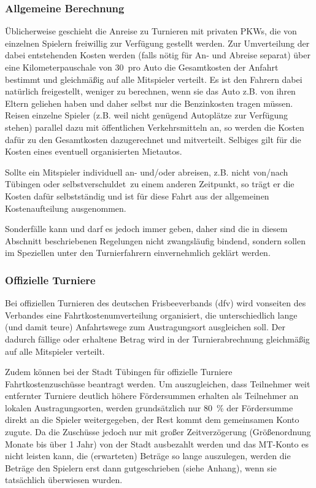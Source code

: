 \documentclass[a4 paper, 11pt]{article}
\begin{document}
\subsubsection{Allgemeine Berechnung}
Üblicherweise geschieht die Anreise zu Turnieren mit privaten PKWs, die von einzelnen Spielern freiwillig zur Verfügung gestellt werden. Zur Umverteilung der dabei entstehenden Kosten werden (falls nötig für An- und Abreise separat) über eine Kilometerpauschale von 30\, pro Auto die Gesamtkosten der Anfahrt bestimmt und gleichmäßig auf alle Mitspieler verteilt. Es ist den Fahrern dabei natürlich freigestellt, weniger zu berechnen, wenn sie das Auto z.B. von ihren Eltern geliehen haben und daher selbst nur die Benzinkosten tragen müssen. Reisen einzelne Spieler (z.B. weil nicht genügend Autoplätze zur Verfügung stehen) parallel dazu mit öffentlichen Verkehrsmitteln an, so werden die Kosten dafür zu den Gesamtkosten dazugerechnet und mitverteilt. Selbiges gilt für die Kosten eines eventuell organisierten Mietautos.

Sollte ein Mitspieler individuell an- und/oder abreisen, z.B. nicht von/nach Tübingen oder \glqq selbstverschuldet\grqq\ zu einem anderen Zeitpunkt, so trägt er die Kosten dafür selbstständig und ist für diese Fahrt aus der allgemeinen Kostenaufteilung ausgenommen.

Sonderfälle kann und darf es jedoch immer geben, daher sind die in diesem Abschnitt beschriebenen Regelungen nicht zwangsläufig bindend, sondern sollen im Speziellen unter den Turnierfahrern einvernehmlich geklärt werden.

\subsubsection{Offizielle Turniere}
Bei offiziellen Turnieren des deutschen Frisbeeverbands (dfv) wird vonseiten des Verbandes eine Fahrtkostenumverteilung organisiert, die unterschiedlich lange (und damit teure) Anfahrtswege zum Austragungsort ausgleichen soll. Der dadurch fällige oder erhaltene Betrag wird in der Turnierabrechnung gleichmäßig auf alle Mitspieler verteilt.

Zudem können bei der Stadt Tübingen für offizielle Turniere Fahrtkostenzuschüsse beantragt werden. Um auszugleichen, dass Teilnehmer weit entfernter Turniere deutlich höhere Fördersummen erhalten als Teilnehmer an lokalen Austragungsorten, werden grundsätzlich nur \SI{80}{\percent} der Fördersumme direkt an die Spieler weitergegeben, der Rest kommt dem gemeinsamen Konto zugute.
Da die Zuschüsse jedoch nur mit großer Zeitverzögerung (Größenordnung Monate bis über 1 Jahr) von der Stadt ausbezahlt werden und das MT-Konto es nicht leisten kann, die (erwarteten) Beträge so lange auszulegen, werden die Beträge den Spielern erst dann gutgeschrieben (siehe Anhang), wenn sie tatsächlich überwiesen wurden.
\end{document}
